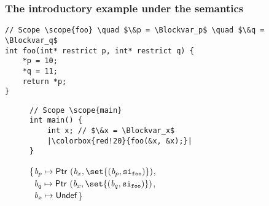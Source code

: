 \begin{frame}[fragile]
\frametitle{The introductory example under the \cinkrestrict semantics}
\begin{verbatim}
// Scope \scope{foo} \quad $\&p = \Blockvar_p$ \quad $\&q = \Blockvar_q$
int foo(int* restrict p, int* restrict q) { 
    *p = 10;
    *q = 11;
    return *p;
}
\end{verbatim}

\begin{figure}[h]
\centering
\begin{minipage}{.33\textwidth}
\begin{verbatim}
// Scope \scope{main}
int main() {
    int x; // $\&x = \Blockvar_x$
    |\colorbox{red!20}{foo(&x, &x);}|
}
\end{verbatim}
\end{minipage}%
\begin{minipage}{.67\textwidth}
\executionannotation
{
\{\colorbox{red!20}{$\Blockvar_p \mapsto \ptr{(\Blockvar_x, \set{(\Blockvar_p, \scope{foo})})}$},\\
                                            \ \colorbox{red!20}{$\Blockvar_q \mapsto \ptr{(\Blockvar_x, \set{(\Blockvar_q, \scope{foo})})}$}, \\
                                            \ $\textit{b}_x \mapsto \mathsf{Undef}$\}
}
{
}
\end{minipage}
\end{figure}
\end{frame}


